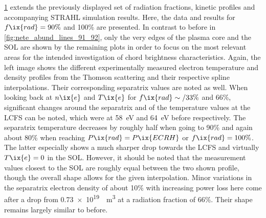 %
        \begin{figure}[t]%
            \centering%
            \begin{minipage}[b]{0.48\textwidth}%
                \centering%
            \end{minipage}%
            \hfill%
            \begin{minipage}[b]{0.48\textwidth}%
                \centering%
            \end{minipage}%
            \label{fig:nete_abund_lines_93_94_edge}%
        \end{figure}%
%
        \cref{fig:nete_abund_lines_93_94_edge} extends the previously displayed set of radiation fractions, kinetic profiles and accompanying STRAHL simulation results. Here, the data and results for $f\ix{rad}=90\%$ and 100\% are presented. In contrast to before in \cref{fig:nete_abund_lines_91_92}, only the very edges of the plasma core and the SOL are shown by the remaining plots in order to focus on the most relevant areas for the intended investigation of chord brightness characteristics. Again, the left image shows the different experimentally measured electron temperature and density profiles from the Thomson scattering and their respective spline interpolations. Their corresponding separatrix values are noted as well. When looking back at $n\ix{e}$ and $T\ix{e}$ for $f\ix{rad}\sim/33\%$ and 66\%, significant changes around the separatrix and of the temperature values at the LCFS can be noted, which were at \SI{58}{\electronvolt} and \SI{64}{\electronvolt} before respectively. The separatrix temperature decreases by roughly half when going to 90\% and again about 80\% when reaching $P\ix{rad}=P\ix{ECRH}$ or $f\ix{rad}=100\%$. The latter especially shows a much sharper drop towards the LCFS and virtually $T\ix{e}=0$ in the SOL. However, it should be noted that the measurement values closest to the SOL are roughly equal between the two shown profile, though the overall shape allows for the given interpolation. Minor variations in the separatrix electron density of about 10\% with increasing power loss here come after a drop from \SI{0.73e19}{\per\cubic\meter} at a radiation fraction of 66\%. Their shape remains largely similar to before.\\%
